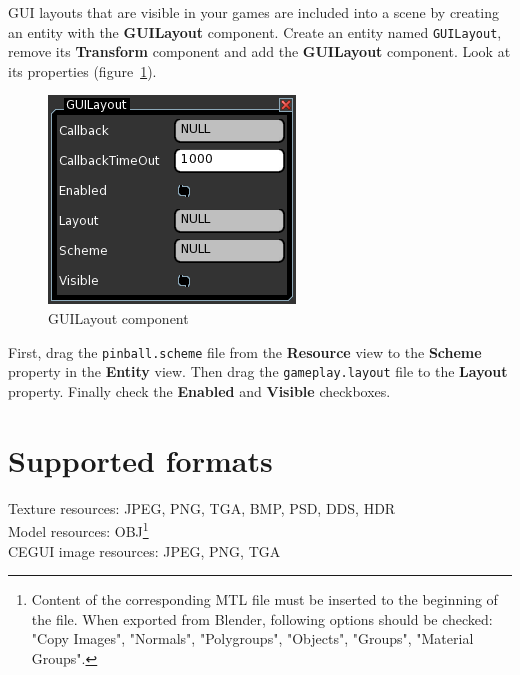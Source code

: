 \documentclass[a4paper,12pt]{article}
\begin{document}
GUI layouts that are visible in your games are included into a scene by creating an entity with the \textbf{GUILayout} component. Create an entity named \texttt{GUILayout}, remove its \textbf{Transform} component and add the \textbf{GUILayout} component. Look at its properties (figure~\ref{fig:guilayout_component}).

\begin{figure}[htb]
 \begin{center}
  \includegraphics[scale=0.65]{GUILayout}
 \end{center}
 \caption{GUILayout component}
 \label{fig:guilayout_component}
\end{figure}

First, drag the \texttt{pinball.scheme} file from the \textbf{Resource} view to the \textbf{Scheme} property in the \textbf{Entity} view. Then drag the \texttt{gameplay.layout} file to the \textbf{Layout} property. Finally check the \textbf{Enabled} and \textbf{Visible} checkboxes.


\section{Supported formats}
\label{sec:supported_formats}
Texture resources: JPEG, PNG, TGA, BMP, PSD, DDS, HDR \\
Model resources: OBJ\footnote{Content of the corresponding MTL file must be inserted to the beginning of the file. When exported from Blender, following options should be checked: "Copy Images", "Normals", "Polygroups", "Objects", "Groups", "Material Groups".} \\
CEGUI image resources: JPEG, PNG, TGA
\end{document}

